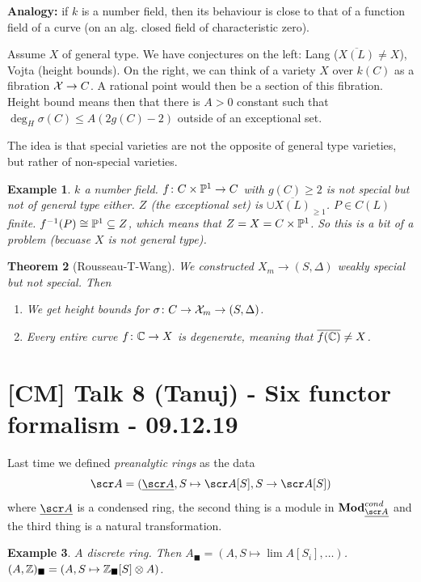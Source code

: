 \documentclass[A4paper, british]{amsart}
\theoremstyle{darkgreentheorem}
\newtheorem{thm}{Theorem}[section]
\theoremstyle{darkbluedefinition}
\theoremstyle{darkredexample}
\newtheorem{exa}[thm]{Example}
\theoremstyle{remark}
\newcommand{\1}{\mathbbm{1}}
\renewcommand{\u}[1]{\underline{#1}}
\newcommand{\ot}{\otimes}
\newcommand{\sub}{\subseteq}
\newcommand{\usolid}{_{\blacksquare}}
\begin{document}
\textbf{Analogy:} if $k$ is a number field, then its behaviour is close to that of a function field of a curve (on an alg. closed field of characteristic zero).

Assume $X$ of general type.
We have conjectures on the left: Lang ($\overline{X(L)}\neq X$), Vojta (height bounds).
On the right, we can think of a variety $X$ over $k(C)$ as a fibration $\X\to C$.
A rational point would then be a section of this fibration.
Height bound means then that there is $A>0$ constant such that $\deg_{H}\sigma(C)\leqslant A(2g(C)-2)$ outside of an exceptional set.

The idea is that special varieties are not the opposite of general type varieties, but rather of non-special varieties.

\begin{exa}
    $k$ a number field.
    $f\colon C\times \P^{1}\to C$ with $g(C)\geqslant 2$ is not special but not of general type either.
    $Z$ (the exceptional set) is $\cup \overline{X(L)}_{\geqslant 1}$.
    $P\in C(L)$ finite.
    $f^{-1}(P)\cong \P^{1}\sub Z$, which means that $Z=X=C\times \P^{1}$.
    So this is a bit of a problem (becuase $X$ is not general type).
\end{exa}

\begin{thm}[Rousseau-T-Wang]
    We constructed $X_{m}\to (S,\Delta)$ weakly special but not special.
    Then
    \begin{enumerate}
	\item We get height bounds for $\sigma \colon C\to \X_{m}\to (S,\Delta)$.
	\item Every entire curve $f\colon \C\to X$ is degenerate, meaning that $\overline{f(\C)}\neq X$.
    \end{enumerate}
\end{thm}

\section{[CM] Talk 8 (Tanuj) - Six functor formalism - 09.12.19}

Last time we defined \textit{preanalytic rings} as the data
\[ \sA=(\u{\sA},S\mapsto \sA[S],S\to \sA[S] ) \]
where $\u{\sA}$ is a condensed ring, the second thing is a module in $\Mod_{\u{\sA}}^{cond}$ and the third thing is a natural transformation.

\begin{exa}
    $A$ discrete ring.
    Then $A\usolid=(A,S\mapsto \lim A[S_{i}],\ldots )$.
    $(A,\Z)\usolid=(A,S\mapsto \Z\usolid [S]\ot A)$.
\end{exa}
\end{document}
